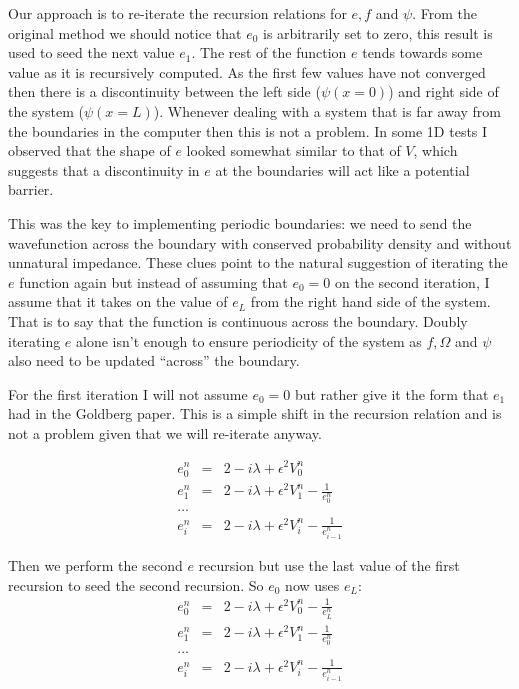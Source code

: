 Our approach is to re-iterate the recursion relations for $e,f$ and $\psi$. From the original method we should notice that $e_0$ is arbitrarily set to zero, this result is used to seed the next value $e_1$. The rest of the function $e$ tends towards some value as it is recursively computed. As the first few values have not converged then there is a discontinuity between the left side ($\psi(x=0)$) and right side of the system ($\psi(x=L)$). Whenever dealing with a system that is far away from the boundaries in the computer then this is not a problem. In some 1D tests I observed that the shape of $e$ looked somewhat similar to that of $V$, which suggests that a discontinuity in $e$ at the boundaries will act like a potential barrier.

This was the key to implementing periodic boundaries: we need to send the wavefunction across the boundary with conserved probability density and without unnatural impedance. These clues point to the natural suggestion of iterating the $e$ function again but instead of assuming that $e_0 = 0$ on the second iteration, I assume that it takes on the value of $e_L$ from the right hand side of the system. That is to say that the function is continuous across the boundary. Doubly iterating $e$ alone isn't enough to ensure periodicity of the system as $f, \Omega$ and $\psi$ also need to be updated ``across'' the boundary.

For the first iteration I will not assume $e_0 = 0$ but rather give it the form that $e_1$ had in the Goldberg paper. This is a simple shift in the recursion relation and is not a problem given that we will re-iterate anyway.

\begin{eqnarray}
e_{0}^n &=& 2 -i\lambda +\epsilon^2 V_{0}^{n} \nonumber \\
e_{1}^n &=& 2 -i\lambda +\epsilon^2 V_{1}^{n} - \frac{1}{e_{0}^n} \nonumber \\
\ldots \nonumber \\
e_{i}^n &=& 2 -i\lambda +\epsilon^2 V_{i}^{n} - \frac{1}{e_{i-1}^n}
\end{eqnarray}

\noindent Then we perform the second $e$ recursion but use the last value of the first recursion to seed the second recursion. So $e_0$ now uses $e_L$:
\begin{eqnarray}
e_{0}^n &=& 2 -i\lambda +\epsilon^2 V_{0}^{n}- \frac{1}{e_{L}^n} \nonumber \\
e_{1}^n &=& 2 -i\lambda +\epsilon^2 V_{1}^{n} - \frac{1}{e_{0}^n} \nonumber \\
\ldots \nonumber \\
e_{i}^n &=& 2 -i\lambda +\epsilon^2 V_{i}^{n} - \frac{1}{e_{i-1}^n}
\end{eqnarray}


